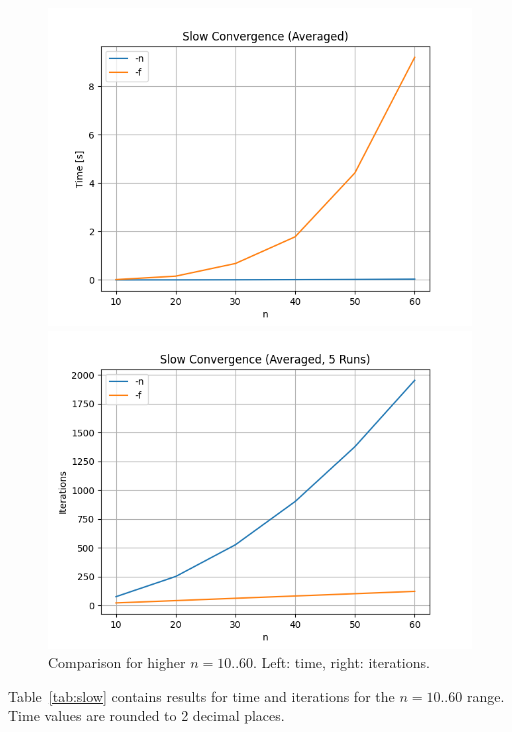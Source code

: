\begin{figure}[ht]
	\centering
	\begin{minipage}{0.49\textwidth}
		\centering
		\includegraphics[width=\textwidth]{./Problems/slow_convergence/plots/time.png}
	\end{minipage}
	\hfill
	\begin{minipage}{0.49\textwidth}
		\centering
		\includegraphics[width=\textwidth]{./Problems/slow_convergence/plots/iterations.png}
	\end{minipage}
	\caption{Comparison for higher $n = 10..60$. Left: time, right: iterations.}
	\label{fig:slow:sidebyside}
\end{figure}

Table~\ref{tab:slow} contains results for time and iterations for the $n = 10..60$ range. Time values are rounded to 2 decimal places.

